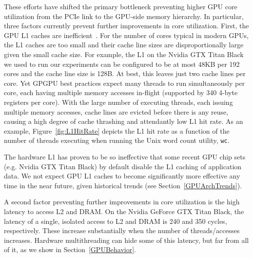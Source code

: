 These efforts have shifted the primary bottleneck preventing higher GPU core utilization from the PCIe link to the GPU-side memory hierarchy.
In particular, three factors currently prevent further improvements in core utilization.
First, the GPU L1 caches are inefficient~\cite{jia2012characterizing}. %
For the number of cores typical in modern GPUs, the L1 caches are too small and their cache line sizes are disproportionally large given the small cache size.
For example,  the L1 on the Nvidia GTX Titan Black we used to run our experiments can be configured to be at most 48KB per 192 cores and the cache line size is 128B.
At best, this leaves just two cache lines per core. 
Yet GPGPU best practices expect many threads to run simultaneously per core, each having multiple memory accesses in-flight (supported by 340 4-byte registers per core).
With the large number of executing threads, each issuing multiple memory accesses, cache lines are evicted before there is any reuse, causing a high degree of cache thrashing and attendantly low L1 hit rate.
As an example, Figure~\ref{fig:L1HitRate} depicts the L1 hit rate as a function of the number of
threads executing when running the Unix word count utility, \texttt{wc}.

The hardware L1 has proven to be so ineffective that some recent GPU chip sets (e.g. Nvidia GTX Titan Black)
by default disable the L1 caching of application data.
We not expect GPU L1 caches to become significantly more effective any time in the near future, given historical trends (see Section~\ref{GPUArchTrends}).

A second factor preventing further improvements in core utilization is the high latency to access L2 and  DRAM. 
On the Nvidia GeForce GTX Titan Black, the latency of a single, isolated access to L2 and DRAM is 240 and 350 cycles, respectively. These
increase substantially when the number of threads/accesses increases.
Hardware multithreading can hide some of this latency, but far from all of it, as we show in Section~\ref{GPUBehavior}.

